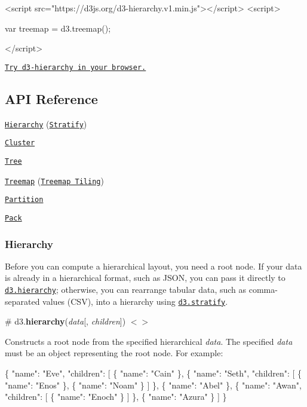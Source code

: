 \begin{DoxyCode}
<script src="https://d3js.org/d3-hierarchy.v1.min.js"></script>
<script>

var treemap = d3.treemap();

</script>
\end{DoxyCode}


\href{https://tonicdev.com/npm/d3-hierarchy}{\tt Try d3-\/hierarchy in your browser.}

\subsection*{A\+PI Reference}


\begin{DoxyItemize}
\item \href{#hierarchy}{\tt Hierarchy} (\href{#stratify}{\tt Stratify})
\item \href{#cluster}{\tt Cluster}
\item \href{#tree}{\tt Tree}
\item \href{#treemap}{\tt Treemap} (\href{#treemap-tiling}{\tt Treemap Tiling})
\item \href{#partition}{\tt Partition}
\item \href{#pack}{\tt Pack}
\end{DoxyItemize}

\subsubsection*{Hierarchy}

Before you can compute a hierarchical layout, you need a root node. If your data is already in a hierarchical format, such as J\+S\+ON, you can pass it directly to \href{#hierarchy}{\tt d3.\+hierarchy}; otherwise, you can rearrange tabular data, such as comma-\/separated values (C\+SV), into a hierarchy using \href{#stratify}{\tt d3.\+stratify}.

\label{_hierarchy}%
\# d3.{\bfseries hierarchy}({\itshape data}\mbox{[}, {\itshape children}\mbox{]}) \href{https://github.com/d3/d3-hierarchy/blob/master/src/hierarchy/index.js#L12}{\tt $<$$>$}

Constructs a root node from the specified hierarchical {\itshape data}. The specified {\itshape data} must be an object representing the root node. For example\+:


\begin{DoxyCode}
\{
  "name": "Eve",
  "children": [
    \{
      "name": "Cain"
    \},
    \{
      "name": "Seth",
      "children": [
        \{
          "name": "Enos"
        \},
        \{
          "name": "Noam"
        \}
      ]
    \},
    \{
      "name": "Abel"
    \},
    \{
      "name": "Awan",
      "children": [
        \{
          "name": "Enoch"
        \}
      ]
    \},
    \{
      "name": "Azura"
    \}
  ]
\}
\end{DoxyCode}


